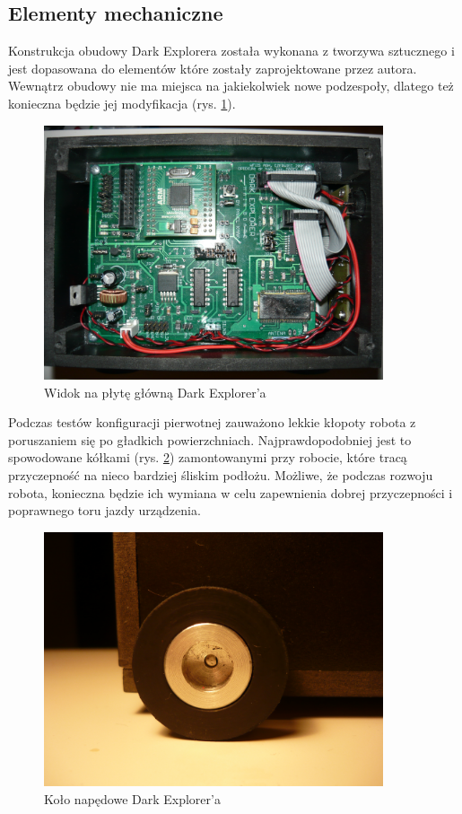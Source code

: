 \subsection{Elementy mechaniczne}
Konstrukcja obudowy Dark Explorera została wykonana z tworzywa sztucznego i jest dopasowana do elementów które zostały zaprojektowane przez autora. Wewnątrz obudowy nie ma miejsca na jakiekolwiek nowe podzespoły, dlatego też konieczna będzie jej modyfikacja (rys. \ref{fig:KmakMainBoard}).

\begin{figure}[!ht]
 \centering
 \includegraphics[height=75mm]{../images/ch02/main_board.jpg}
 \caption{Widok na płytę główną Dark Explorer'a}
 \label{fig:KmakMainBoard}
\end{figure}

Podczas testów konfiguracji pierwotnej zauważono lekkie kłopoty robota z poruszaniem się po gładkich powierzchniach. Najprawdopodobniej jest to spowodowane kółkami (rys. \ref{fig:KmakWheel}) zamontowanymi przy robocie, które tracą przyczepność na nieco bardziej śliskim podłożu. Możliwe, że podczas rozwoju robota, konieczna będzie ich wymiana w celu zapewnienia dobrej przyczepności i poprawnego toru jazdy urządzenia.

\begin{figure}[!ht]
 \centering
 \includegraphics[height=75mm]{../images/ch02/wheel.jpg}
 \caption{Koło napędowe Dark Explorer'a}
 \label{fig:KmakWheel}
\end{figure}
